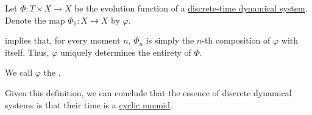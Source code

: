 \begin{definition}\label{def:one_step_evolution_function}\mimprovised
  Let \( \Phi: T \times X \to X \) be the evolution function of a \hyperref[def:discrete_dynamical_system]{discrete-time dynamical system}. Denote the map \( \Phi_1: X \to X \) by \( \varphi \).

   implies that, for every moment \( n \), \( \Phi_n \) is simply the \( n \)-th composition of \( \varphi \) with itself. Thus, \( \varphi \) uniquely determines the entirety of \( \Phi \).

  We call \( \varphi \) the .
\end{definition}
\begin{comments}
  \item Given this definition, we can conclude that the essence of discrete dynamical systems is that their time is a \hyperref[def:cyclic_monoid]{cyclic monoid}.
\end{comments}

